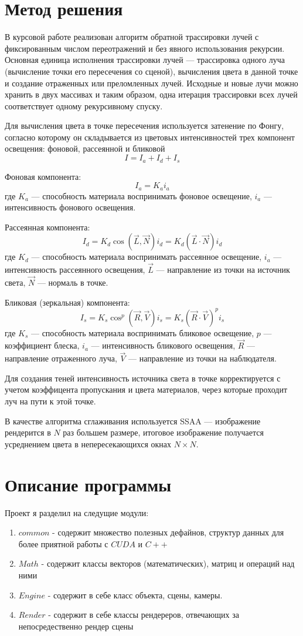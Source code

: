 \section{Метод решения}
В курсовой работе реализован алгоритм обратной трассировки лучей с фиксированным числом переотражений и без явного использования рекурсии. Основная единица исполнения трассировки лучей --- трассировка одного луча (вычисление точки его пересечения со сценой), вычисления цвета в данной точке и создание отраженных или преломленных лучей. Исходные и новые лучи можно хранить в двух массивах и таким образом, одна итерация трассировки всех лучей соответствует одному рекурсивному спуску.

Для вычисления цвета в точке пересечения используется затенение по Фонгу, согласно которому он складывается из цветовых интенсивностей трех компонент освещения: фоновой, рассеянной и бликовой
$$I = I_a + I_d + I_s$$

Фоновая компонента:
$$I_a = K_a i_a$$
где $K_a$ --- способность материала воспринимать фоновое освещение, $i_a$ --- интенсивность фонового освещения.

Рассеянная компонента:
$$I_d = K_d \cos(\vec{L}, \vec{N}) i_d = K_d (\vec{L} \cdot \vec{N}) i_d$$
где $K_d$ --- способность материала воспринимать рассеянное освещение, $i_a$ --- интенсивность рассеянного освещения, $\vec{L}$ --- направление из точки на источник света, $\vec{N}$ --- нормаль в точке.

Бликовая (зеркальная) компонента:
$$I_s = K_s \cos^p(\vec{R}, \vec{V}) i_s = K_s (\vec{R} \cdot \vec{V})^p i_s$$
где $K_s$ --- способность материала воспринимать бликовое освещение, $p$ --- коэффициент блеска, $i_a$ --- интенсивность бликового освещения, $\vec{R}$ --- направление отраженного луча, $\vec{V}$ --- направление из точки на наблюдателя.

Для создания теней интенсивность источника света в точке корректируется с учетом коэффицента пропускания и цвета материалов, через которые проходит луч на пути к этой точке.

В качестве алгоритма сглаживания используется SSAA --- изображение рендерится в $N$ раз большем размере, итоговое изображение получается усреднением цвета в непересекающихся окнах $N \times N$.


\section{Описание программы}
Проект я разделил на следущие модули:
\begin{enumerate}
    \item $common$ - содержит множество полезных дефайнов, структур данных для более приятной работы с $CUDA$ и $C++$
    \item $Math$ - содержит классы векторов (математических), матриц и операций над ними
    \item $Engine$ - содержит в себе класс объекта, сцены, камеры.
    \item $Render$ - содержит в себе классы рендереров, отвечающих за непосредественно рендер сцены
\end{enumerate}

